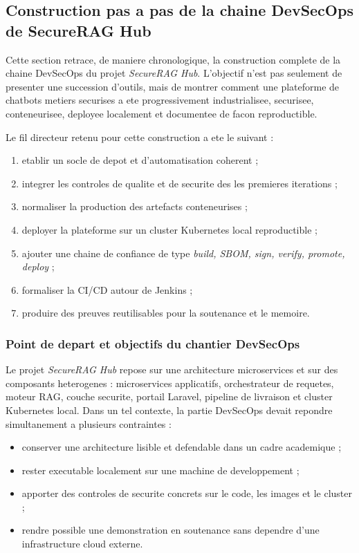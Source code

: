 \subsection{Construction pas a pas de la chaine DevSecOps de SecureRAG Hub}
\label{sec:devsecops-end-to-end}

Cette section retrace, de maniere chronologique, la construction complete de la chaine DevSecOps du projet \textit{SecureRAG Hub}. L'objectif n'est pas seulement de presenter une succession d'outils, mais de montrer comment une plateforme de chatbots metiers securises a ete progressivement industrialisee, securisee, conteneurisee, deployee localement et documentee de facon reproductible.

Le fil directeur retenu pour cette construction a ete le suivant :

\begin{enumerate}
  \item etablir un socle de depot et d'automatisation coherent ;
  \item integrer les controles de qualite et de securite des les premieres iterations ;
  \item normaliser la production des artefacts conteneurises ;
  \item deployer la plateforme sur un cluster Kubernetes local reproductible ;
  \item ajouter une chaine de confiance de type \textit{build, SBOM, sign, verify, promote, deploy} ;
  \item formaliser la CI/CD autour de Jenkins ;
  \item produire des preuves reutilisables pour la soutenance et le memoire.
\end{enumerate}

\subsubsection{Point de depart et objectifs du chantier DevSecOps}

Le projet \textit{SecureRAG Hub} repose sur une architecture microservices et sur des composants heterogenes : microservices applicatifs, orchestrateur de requetes, moteur RAG, couche securite, portail Laravel, pipeline de livraison et cluster Kubernetes local. Dans un tel contexte, la partie DevSecOps devait repondre simultanement a plusieurs contraintes :

\begin{itemize}
  \item conserver une architecture lisible et defendable dans un cadre academique ;
  \item rester executable localement sur une machine de developpement ;
  \item apporter des controles de securite concrets sur le code, les images et le cluster ;
  \item rendre possible une demonstration en soutenance sans dependre d'une infrastructure cloud externe.
\end{itemize}

